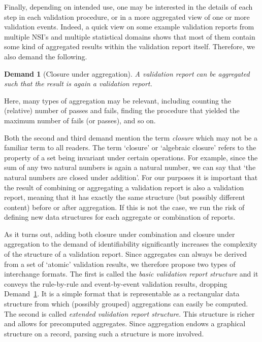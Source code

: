 \documentclass[a4paper, 11pt]{article}
\newtheorem{demand}{Demand}
\begin{document}
Finally, depending on intended use, one may be interested in the details of
each step in each validation procedure, or in a more aggregated view of one or
more validation events. Indeed, a quick view on some example validation reports
from multiple NSI's and multiple statistical domains shows that most of them
contain some kind of aggregated results within the validation report itself.
Therefore, we also demand the following.

\begin{demand}[Closure under aggregation]
A validation report can be aggregated such that the result is again a
validation report.
\label{dem:aggregate}
\end{demand}

Here, many types of aggregation may be relevant, including counting the
(relative) number of passes and fails, finding the procedure that yielded the
maximum number of fails (or passes), and so on.

Both the second and third demand mention the term \emph{closure} which may not be a
familiar term to all readers. The term `closure' or `algebraic closure' refers
to the property of a set being invariant under certain operations. For example,
since the sum of any two natural numbers is again a natural number, we can say
that ‘the natural numbers are closed under addition’. For our purposes it is
important that the result of combining or aggregating a validation report is
also a validation report, meaning that it has exactly the same structure (but
possibly different content) before or after aggregation. If this is not the
case, we run the risk of defining new data structures for each aggregate or
combination of reports.

As it turns out, adding both closure under combination and closure under
aggregation to the demand of identifiability significantly increases the
complexity of the structure of a validation report. Since aggregates can always
be derived from a set of `atomic' validation results, we therefore propose two
types of interchange formats. The first is called the \emph{basic validation
report structure} and it conveys the rule-by-rule and event-by-event validation
results, dropping Demand~\ref{dem:aggregate}. It is a simple format that is
representable as a rectangular data structure from which (possibly
grouped) aggregations can easily be computed.  The second is called
\emph{extended validation report structure}. This structure is richer and
allows for precomputed aggregates.  Since aggregation endows a graphical
structure on a record, parsing such a structure is more involved.
\end{document}

